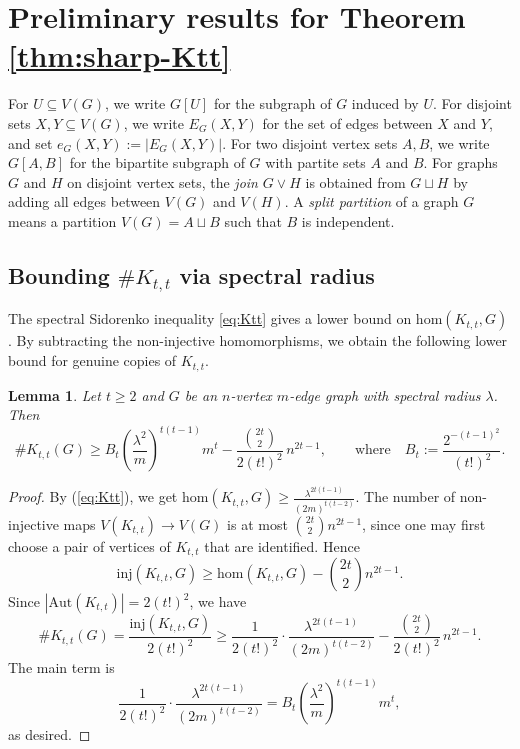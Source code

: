 \documentclass[10pt,a4paper]{amsart}
\newtheorem{lemma}[theorem]{Lemma}
\newcommand{\Ktt}{K_{t,t}}
\newcommand{\inj}{\mathrm{inj}}
\newcommand{\homc}{\mathrm{hom}}
\newcommand{\Aut}{\mathrm{Aut}}
\begin{document}
\section{Preliminary results for Theorem \ref{thm:sharp-Ktt}}

\label{sec:preliminaries}

For \(U\subseteq V(G)\), we write \(G[U]\) for the subgraph of \(G\)
induced by \(U\).  For disjoint sets \(X,Y\subseteq V(G)\), we write
\(E_G(X,Y)\) for the set of edges between \(X\) and \(Y\), and set
\(e_G(X,Y):=|E_G(X,Y)|\).  For two disjoint vertex sets \(A,B\), we
write \(G[A,B]\) for the bipartite subgraph of \(G\) with partite sets
\(A\) and \(B\).  For graphs \(G\) and \(H\) on disjoint vertex sets,
the \emph{join} \(G\vee H\) is obtained from \(G\sqcup H\) by adding
all edges between \(V(G)\) and \(V(H)\).  A \emph{split partition} of a
graph \(G\) means a partition \(V(G)=A\sqcup B\) such that \(B\) is
independent.


\subsection{Bounding \(\texttt{\#}K_{t,t}\) via spectral radius}
The spectral Sidorenko inequality \eqref{eq:Ktt} gives a lower bound on
\(\homc(K_{t,t},G)\).  By subtracting the non-injective homomorphisms,
we obtain the following lower bound for genuine copies of \(K_{t,t}\).

\begin{lemma}
\label{lem:spectral-count-Ktt}
Let \(t\ge 2\) and \(G\) be an \(n\)-vertex $m$-edge graph with spectral
radius \(\lambda\). Then        
\[
  \texttt{\#}\Ktt(G)
  \ge
  B_t\left(\frac{\lambda^2}{m}\right)^{t(t-1)}m^t
  -
  \frac{\binom{2t}{2}}{2(t!)^2}\,n^{2t-1}, \qquad\text{where}\quad B_t:=\frac{2^{-(t-1)^2}}{(t!)^2}. 
\]
\end{lemma}

\begin{proof}
By (\ref{eq:Ktt}), we get $\homc(\Ktt,G)
  \ge
  \frac{\lambda^{2t(t-1)}}{(2m)^{t(t-2)}}$. The number of non-injective maps \(V(\Ktt)\to V(G)\) is at most
\(\binom{2t}{2}n^{2t-1}\), since one may first choose a pair of vertices
of \(K_{t,t}\) that are identified.  Hence
\[
  \inj(\Ktt,G)
  \ge
  \homc(\Ktt,G)-\binom{2t}{2}n^{2t-1}.
\]
Since \(|\Aut(\Ktt)|=2(t!)^2\), we have
\[
  \texttt{\#}\Ktt(G)
  =
  \frac{\inj(\Ktt,G)}{2(t!)^2}
  \ge
  \frac{1}{2(t!)^2}
  \cdot
  \frac{\lambda^{2t(t-1)}}{(2m)^{t(t-2)}}
  -
  \frac{\binom{2t}{2}}{2(t!)^2}\,n^{2t-1}.
\]
The main term is
\[
  \frac{1}{2(t!)^2}
  \cdot
  \frac{\lambda^{2t(t-1)}}{(2m)^{t(t-2)}}
  =
  B_t\left(\frac{\lambda^2}{m}\right)^{t(t-1)}m^t,
\]
as desired.
\end{proof}
\end{document}
